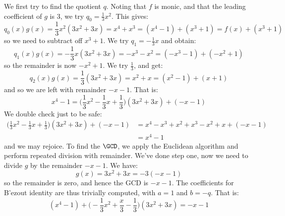 \documentclass{article}                                                        %
\begin{document}
        \begin{solution}
            We first try to find the quotient $q$. Noting that $f$ is monic, and
            that the leading coefficient of $g$ is 3, we try
            $q_{0}=\frac{1}{3}x^{2}$. This gives:
            \begin{equation}
                q_{0}(x)g(x)=\frac{1}{3}x^{2}(3x^{2}+3x)
                    =x^{4}+x^{3}=(x^{4}-1)+(x^{3}+1)
                    =f(x)+(x^{3}+1)
            \end{equation}
            so we need to subtract off $x^{3}+1$. We try
            $q_{1}=\minus\frac{1}{3}x$ and obtain:
            \begin{equation}
                q_{1}(x)g(x)=\minus\frac{1}{3}x(3x^{2}+3x)
                    =\minus{x}^{3}-x^{2}
                    =(\minus{x}^{3}-1)+(\minus{x}^{2}+1)
            \end{equation}
            so the remainder is now $\minus{x}^{2}+1$. We try $\frac{1}{3}$, and
            get:
            \begin{equation}
                q_{2}(x)g(x)=\frac{1}{3}(3x^{2}+3x)
                    =x^{2}+x
                    =(x^{2}-1)+(x+1)
            \end{equation}
            and so we are left with remainder $\minus{x}-1$. That is:
            \begin{equation}
                x^{4}-1=\Big(\frac{1}{3}x^{2}-\frac{1}{3}x+\frac{1}{3}\Big)
                    (3x^{2}+3x)+(\minus{x}-1)
            \end{equation}
            We double check just to be safe:
            \begin{align*}
                \Big(\frac{1}{3}x^{2}-\frac{1}{3}x+\frac{1}{3}\Big)(3x^{2}+3x)
                    +(\minus{x}-1)
                    &=x^{4}-x^{3}+x^{2}+x^{3}-x^{2}+x+(\minus{x}-1)\\
                    &=x^{4}-1
            \end{align*}
            and we may rejoice. To find the $\GCD$, we apply the Euclidean
            algorithm and perform repeated division with remainder. We've done
            step one, now we need to divide $g$ by the remainder
            $\minus{x}-1$. We have:
            \begin{equation}
                g(x)=3x^{2}+3x=\minus{3}(\minus{x}-1)
            \end{equation}
            so the remainder is zero, and hence the GCD is $\minus{x}-1$. The
            coefficients for B'{e}zout identity are thus trivially computed,
            with $a=1$ and $b=\minus{q}$. That is:
            \begin{equation}
                (x^{4}-1)+
                    \Big(\minus\frac{1}{3}x^{2}+\frac{x}{3}-\frac{1}{3}\Big)
                    (3x^{2}+3x)=\minus{x}-1
            \end{equation}
        \end{solution}
\end{document}
